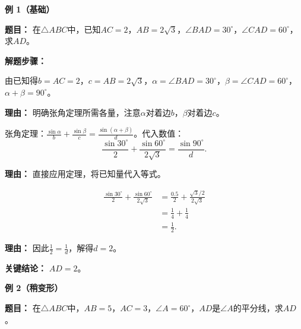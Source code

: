 \begin{examplebox}
	\textbf{\textcolor{CExample}{例 1（基础）}}

	\textbf{\textcolor{CExample}{题目：}}
	在$\triangle ABC$中，已知$AC=2$，$AB=2\sqrt{3}$，$\angle BAD=30^\circ$，$\angle CAD=60^\circ$，求$AD$。

	\textbf{\textcolor{CExample}{解题步骤：}}
	\begin{description}[style=nextline, leftmargin=2.8em, labelsep=0.5em, itemsep=0.45em]
		\item[\textbf{第一步(识别条件):}] 由已知得$b=AC=2$，$c=AB=2\sqrt{3}$，$\alpha=\angle BAD=30^\circ$，$\beta=\angle CAD=60^\circ$，$\alpha+\beta=90^\circ$。
			\par\textbf{理由：} 明确张角定理所需各量，注意$\alpha$对着边$b$，$\beta$对着边$c$。
		\item[\textbf{第二步(代入公式):}] 张角定理：$\displaystyle\frac{\sin\alpha}{b}+\frac{\sin\beta}{c}=\frac{\sin(\alpha+\beta)}{d}$。代入数值：
			\[
				\frac{\sin30^\circ}{2}+\frac{\sin60^\circ}{2\sqrt{3}}=\frac{\sin90^\circ}{d}.
			\]
			\par\textbf{理由：} 直接应用定理，将已知量代入等式。
		\item[\textbf{第三步(计算结果):}]
			\[
				\begin{aligned}
					\frac{\sin30^\circ}{2}+\frac{\sin60^\circ}{2\sqrt{3}}
					&= \frac{0.5}{2}+\frac{\sqrt3/2}{2\sqrt3} \\
					&= \frac14+\frac14 \\
					&= \frac12.
			\end{aligned}
			\]
			\par\textbf{理由：} 因此$\frac12=\frac{1}{d}$，解得$d=2$。
	\end{description}

	\textbf{\textcolor{CExample}{关键结论：}}
	$AD=2$。

	\medskip
	\textbf{\textcolor{CExample}{例 2（稍变形）}}

	\textbf{\textcolor{CExample}{题目：}}
	在$\triangle ABC$中，$AB=5$，$AC=3$，$\angle A=60^\circ$，$AD$是$\angle A$的平分线，求$AD$。


\end{examplebox}
